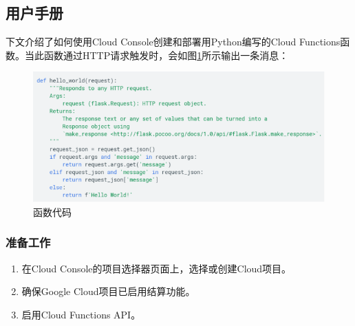 \documentclass[11pt]{article}
\begin{document}
\subsection{用户手册}	
下文介绍了如何使用Cloud Console创建和部署用Python编写的Cloud Functions函数。当此函数通过HTTP请求触发时，会如图\ref{fig14}所示输出一条消息：

\begin{figure}[h]	
	\centering
	\includegraphics[scale=0.6]{figs/14.png}
	\caption{函数代码}
	\label{fig14}	
\end{figure}	

\subsubsection{准备工作} 
\begin{enumerate}
	\item 在Cloud Console的项目选择器页面上，选择或创建Cloud项目。
	\item 确保Google Cloud项目已启用结算功能。
	\item 启用Cloud Functions API。
\end{enumerate}	
\end{document}
